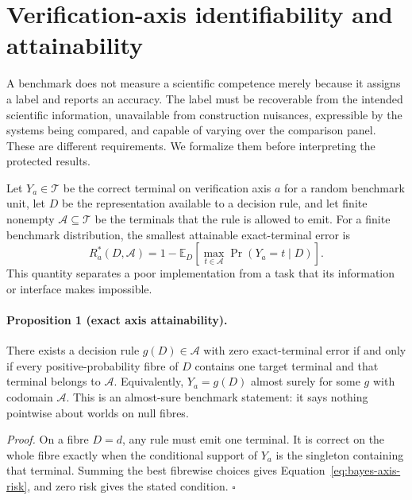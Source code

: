 \section{Verification-axis identifiability and attainability}
\label{sec:axis-theory}

A benchmark does not measure a scientific competence merely because it assigns a
label and reports an accuracy.  The label must be recoverable from the intended
scientific information, unavailable from construction nuisances, expressible by
the systems being compared, and capable of varying over the comparison panel.
These are different requirements.  We formalize them before interpreting the
protected results.

Let $Y_a\in\mathcal{T}$ be the correct terminal on verification axis $a$ for a
random benchmark unit, let $D$ be the representation available to a decision
rule, and let finite nonempty $\mathcal{A}\subseteq\mathcal{T}$ be the terminals
that the rule is allowed to emit.  For a finite benchmark distribution, the
smallest attainable exact-terminal error is
\begin{equation}
  R_a^*(D,\mathcal{A})
  = 1-\mathbb{E}_{D}\!\left[
      \max_{t\in\mathcal{A}}\Pr(Y_a=t\mid D)
    \right].
  \label{eq:bayes-axis-risk}
\end{equation}
This quantity separates a poor implementation from a task that its information
or interface makes impossible.

\paragraph{Proposition 1 (exact axis attainability).}
There exists a decision rule $g(D)\in\mathcal{A}$ with zero exact-terminal error
if and only if every positive-probability fibre of $D$ contains one target
terminal and that terminal belongs to $\mathcal{A}$.  Equivalently,
$Y_a=g(D)$ almost surely for some $g$ with codomain $\mathcal{A}$.  This is an
almost-sure benchmark statement: it says nothing pointwise about worlds on null
fibres.

\emph{Proof.}  On a fibre $D=d$, any rule must emit one terminal.  It is correct
on the whole fibre exactly when the conditional support of $Y_a$ is the
singleton containing that terminal.  Summing the best fibrewise choices gives
Equation~\ref{eq:bayes-axis-risk}, and zero risk gives the stated condition.
\hfill$\square$

